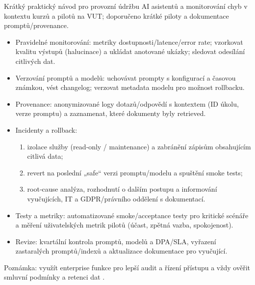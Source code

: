 \begin{flushleft}Krátký praktický návod pro provozní údržbu AI asistentů a monitorování chyb v kontextu kurzů a pilotů na VUT; doporučeno krátké piloty a dokumentace promptů/provenance.\end{flushleft}
\begin{itemize}
  \item Pravidelné monitorování: metriky dostupnosti/latence/error rate; vzorkovat kvalitu výstupů (halucinace) a ukládat anotované ukázky; sledovat odesílání citlivých dat.
  \item Verzování promptů a modelů: uchovávat prompty s konfigurací a časovou známkou, vést changelog; verzovat metadata modelu pro možnost rollbacku.
  \item Provenance: anonymizované logy dotazů/odpovědí s kontextem (ID úkolu, verze promptu) a zaznamenat, které dokumenty byly retrieved.
  \item Incidenty a rollback:
    \begin{enumerate}
      \item izolace služby (read‑only / maintenance) a zabránění zápisům obsahujícím citlivá data;
      \item revert na poslední „safe“ verzi promptu/modelu a spuštění smoke tests;
      \item root‑cause analýza, rozhodnutí o dalším postupu a informování vyučujících, IT a GDPR/právního oddělení s dokumentací.
    \end{enumerate}
  \item Testy a metriky: automatizované smoke/acceptance testy pro kritické scénáře a měření uživatelských metrik pilotů (účast, zpětná vazba, spokojenost).
  \item Revize: kvartální kontrola promptů, modelů a DPA/SLA, vyřazení zastaralých promptů/indexů a aktualizace dokumentace pro vyučující.
\end{itemize}
\begin{flushleft}Poznámka: využít enterprise funkce pro lepší audit a řízení přístupu a vždy ověřit smluvní podmínky a retenci dat \cite{kb_ai_101_tipu_pdf_04e4a115_page_3_1}.\end{flushleft}